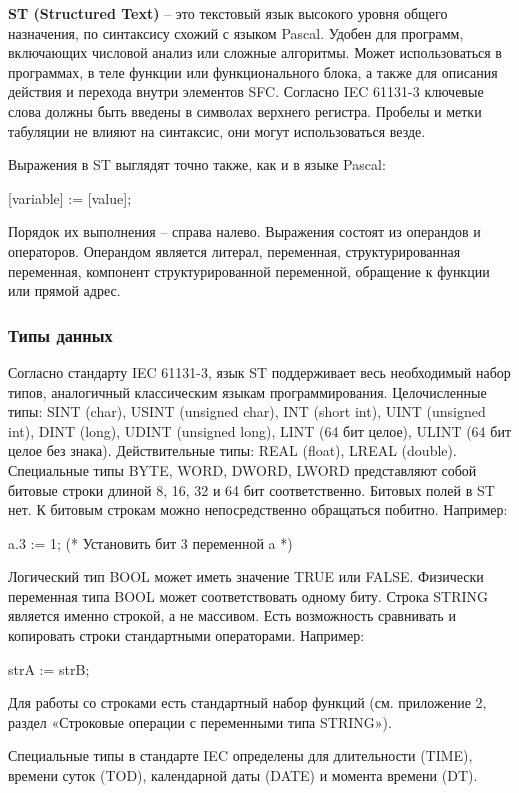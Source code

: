 \documentclass[letterpaper,10pt,russian]{sphinxmanual}
\begin{document}
\textbf{ST (Structured Text)} – это текстовый язык высокого уровня общего
назначения, по синтаксису схожий с языком Pascal. Удобен для программ,
включающих числовой анализ или сложные алгоритмы. Может использоваться в
программах, в теле функции или функционального блока, а также для
описания действия и перехода внутри элементов SFC. Согласно IEC 61131-3
ключевые слова должны быть введены в символах верхнего регистра. Пробелы
и метки табуляции не влияют на синтаксис, они могут использоваться
везде.

Выражения в ST выглядят точно также, как и в языке Pascal:

{[}variable{]} := {[}value{]};

Порядок их выполнения – справа налево. Выражения состоят из операндов и
операторов. Операндом является литерал, переменная, структурированная
переменная, компонент структурированной переменной, обращение к функции
или прямой адрес.


\subsubsection{Типы данных}
\label{iec_guide/st_guide:id2}
Согласно стандарту IEC 61131-3, язык ST поддерживает весь необходимый
набор типов, аналогичный классическим языкам программирования.
Целочисленные типы: SINT (char), USINT (unsigned char), INT (short int),
UINT (unsigned int), DINT (long), UDINT (unsigned long), LINT (64 бит
целое), ULINT (64 бит целое без знака). Действительные типы: REAL
(float), LREAL (double). Специальные типы BYTE, WORD, DWORD, LWORD
представляют собой битовые строки длиной 8, 16, 32 и 64 бит
соответственно. Битовых полей в ST нет. К битовым строкам можно
непосредственно обращаться побитно. Например:

a.3 := 1; (* Установить бит 3 переменной a *)

Логический тип BOOL может иметь значение TRUE или FALSE. Физически
переменная типа BOOL может соответствовать одному биту. Строка STRING
является именно строкой, а не массивом. Есть возможность сравнивать и
копировать строки стандартными операторами. Например:

strA := strB;

Для работы со строками есть стандартный набор функций (см. приложение 2,
раздел «Строковые операции с переменными типа STRING»).

Специальные типы в стандарте IEC определены для длительности (TIME),
времени суток (TOD), календарной даты (DATE) и момента времени (DT).
\end{document}
